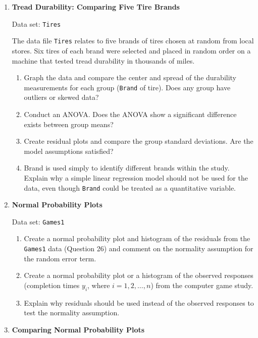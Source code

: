 \documentclass[
]{book}
\begin{document}
\begin{enumerate}
  \item \textbf{Tread Durability: Comparing Five Tire Brands}

Data set: \texttt{Tires}

The data file \texttt{Tires} relates to five brands of tires chosen at random from local stores. Six tires of each brand were selected and placed in random order on a machine that tested tread durability in thousands of miles.

  \begin{enumerate}
    \item Graph the data and compare the center and spread of the durability measurements for each group (\texttt{Brand} of tire). Does any group have outliers or skewed data?
      \item Conduct an ANOVA. Does the ANOVA show a significant difference exists between group means?
      \item Create residual plots and compare the group standard deviations. Are the model assumptions satisfied?
      \item Brand is used simply to identify different brands within the study. Explain why a simple linear regression model should not be used for the data, even though \texttt{Brand} could be treated as a quantitative variable.
    \end{enumerate}

  \item \textbf{Normal Probability Plots}

Data set: \texttt{Games1}

  \begin{enumerate}
    \item Create a normal probability plot and histogram of the residuals from the \texttt{Games1} data (Question 26) and comment on the normality assumption for the random error term.
      \item Create a normal probability plot or a histogram of the observed responses (completion times $y_i$, where $i = 1, 2, \ldots, n$) from the computer game study.
      \item Explain why residuals should be used instead of the observed responses to test the normality assumption.
    \end{enumerate}

  \item \textbf{Comparing Normal Probability Plots}


\end{enumerate}
\end{document}
